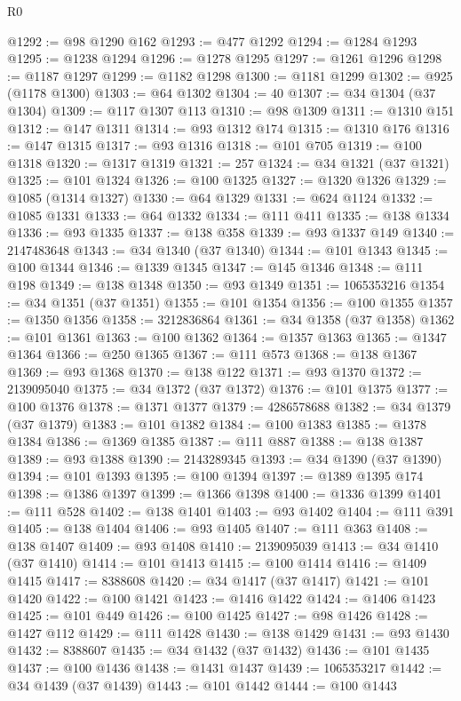 \begin{lexlean}{R0}
\begin{coremodule}
@1292 := @98 @1290 @162
@1293 := @477 @1292
@1294 := @1284 @1293
@1295 := @1238 @1294
@1296 := @1278 @1295
@1297 := @1261 @1296
@1298 := @1187 @1297
@1299 := @1182 @1298
@1300 := @1181 @1299
@1302 := @925 (@1178 @1300)
@1303 := @64 @1302
@1304 := 40
@1307 := @34 @1304 (@37 @1304)
@1309 := @117 @1307 @113
@1310 := @98 @1309
@1311 := @1310 @151
@1312 := @147 @1311
@1314 := @93 @1312 @174
@1315 := @1310 @176
@1316 := @147 @1315
@1317 := @93 @1316
@1318 := @101 @705
@1319 := @100 @1318
@1320 := @1317 @1319
@1321 := 257
@1324 := @34 @1321 (@37 @1321)
@1325 := @101 @1324
@1326 := @100 @1325
@1327 := @1320 @1326
@1329 := @1085 (@1314 @1327)
@1330 := @64 @1329
@1331 := @624 @1124
@1332 := @1085 @1331
@1333 := @64 @1332
@1334 := @111 @411
@1335 := @138 @1334
@1336 := @93 @1335
@1337 := @138 @358
@1339 := @93 @1337 @149
@1340 := 2147483648
@1343 := @34 @1340 (@37 @1340)
@1344 := @101 @1343
@1345 := @100 @1344
@1346 := @1339 @1345
@1347 := @145 @1346
@1348 := @111 @198
@1349 := @138 @1348
@1350 := @93 @1349
@1351 := 1065353216
@1354 := @34 @1351 (@37 @1351)
@1355 := @101 @1354
@1356 := @100 @1355
@1357 := @1350 @1356
@1358 := 3212836864
@1361 := @34 @1358 (@37 @1358)
@1362 := @101 @1361
@1363 := @100 @1362
@1364 := @1357 @1363
@1365 := @1347 @1364
@1366 := @250 @1365
@1367 := @111 @573
@1368 := @138 @1367
@1369 := @93 @1368
@1370 := @138 @122
@1371 := @93 @1370
@1372 := 2139095040
@1375 := @34 @1372 (@37 @1372)
@1376 := @101 @1375
@1377 := @100 @1376
@1378 := @1371 @1377
@1379 := 4286578688
@1382 := @34 @1379 (@37 @1379)
@1383 := @101 @1382
@1384 := @100 @1383
@1385 := @1378 @1384
@1386 := @1369 @1385
@1387 := @111 @887
@1388 := @138 @1387
@1389 := @93 @1388
@1390 := 2143289345
@1393 := @34 @1390 (@37 @1390)
@1394 := @101 @1393
@1395 := @100 @1394
@1397 := @1389 @1395 @174
@1398 := @1386 @1397
@1399 := @1366 @1398
@1400 := @1336 @1399
@1401 := @111 @528
@1402 := @138 @1401
@1403 := @93 @1402
@1404 := @111 @391
@1405 := @138 @1404
@1406 := @93 @1405
@1407 := @111 @363
@1408 := @138 @1407
@1409 := @93 @1408
@1410 := 2139095039
@1413 := @34 @1410 (@37 @1410)
@1414 := @101 @1413
@1415 := @100 @1414
@1416 := @1409 @1415
@1417 := 8388608
@1420 := @34 @1417 (@37 @1417)
@1421 := @101 @1420
@1422 := @100 @1421
@1423 := @1416 @1422
@1424 := @1406 @1423
@1425 := @101 @449
@1426 := @100 @1425
@1427 := @98 @1426
@1428 := @1427 @112
@1429 := @111 @1428
@1430 := @138 @1429
@1431 := @93 @1430
@1432 := 8388607
@1435 := @34 @1432 (@37 @1432)
@1436 := @101 @1435
@1437 := @100 @1436
@1438 := @1431 @1437
@1439 := 1065353217
@1442 := @34 @1439 (@37 @1439)
@1443 := @101 @1442
@1444 := @100 @1443

\end{coremodule}
\end{lexlean}
